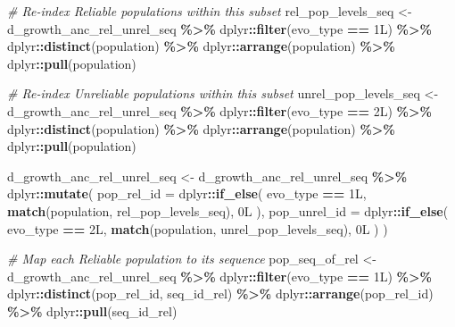 \documentclass[
]{article}
\newenvironment{Shaded}{\begin{snugshade}}{\end{snugshade}}
\newcommand{\AttributeTok}[1]{\textcolor[rgb]{0.13,0.29,0.53}{#1}}
\newcommand{\CommentTok}[1]{\textcolor[rgb]{0.56,0.35,0.01}{\textit{#1}}}
\newcommand{\DataTypeTok}[1]{\textcolor[rgb]{0.13,0.29,0.53}{#1}}
\newcommand{\DecValTok}[1]{\textcolor[rgb]{0.00,0.00,0.81}{#1}}
\newcommand{\FunctionTok}[1]{\textcolor[rgb]{0.13,0.29,0.53}{\textbf{#1}}}
\newcommand{\NormalTok}[1]{#1}
\newcommand{\OtherTok}[1]{\textcolor[rgb]{0.56,0.35,0.01}{#1}}
\newcommand{\SpecialCharTok}[1]{\textcolor[rgb]{0.81,0.36,0.00}{\textbf{#1}}}
\begin{document}
\begin{Shaded}
\begin{Highlighting}[]
\CommentTok{\# Re{-}index Reliable populations within this subset}
\NormalTok{rel\_pop\_levels\_seq }\OtherTok{\textless{}{-}}\NormalTok{ d\_growth\_anc\_rel\_unrel\_seq }\SpecialCharTok{\%\textgreater{}\%}
\NormalTok{  dplyr}\SpecialCharTok{::}\FunctionTok{filter}\NormalTok{(evo\_type }\SpecialCharTok{==} \DecValTok{1}\DataTypeTok{L}\NormalTok{) }\SpecialCharTok{\%\textgreater{}\%}
\NormalTok{  dplyr}\SpecialCharTok{::}\FunctionTok{distinct}\NormalTok{(population) }\SpecialCharTok{\%\textgreater{}\%}
\NormalTok{  dplyr}\SpecialCharTok{::}\FunctionTok{arrange}\NormalTok{(population) }\SpecialCharTok{\%\textgreater{}\%}
\NormalTok{  dplyr}\SpecialCharTok{::}\FunctionTok{pull}\NormalTok{(population)}

\CommentTok{\# Re{-}index Unreliable populations within this subset}
\NormalTok{unrel\_pop\_levels\_seq }\OtherTok{\textless{}{-}}\NormalTok{ d\_growth\_anc\_rel\_unrel\_seq }\SpecialCharTok{\%\textgreater{}\%}
\NormalTok{  dplyr}\SpecialCharTok{::}\FunctionTok{filter}\NormalTok{(evo\_type }\SpecialCharTok{==} \DecValTok{2}\DataTypeTok{L}\NormalTok{) }\SpecialCharTok{\%\textgreater{}\%}
\NormalTok{  dplyr}\SpecialCharTok{::}\FunctionTok{distinct}\NormalTok{(population) }\SpecialCharTok{\%\textgreater{}\%}
\NormalTok{  dplyr}\SpecialCharTok{::}\FunctionTok{arrange}\NormalTok{(population) }\SpecialCharTok{\%\textgreater{}\%}
\NormalTok{  dplyr}\SpecialCharTok{::}\FunctionTok{pull}\NormalTok{(population)}

\NormalTok{d\_growth\_anc\_rel\_unrel\_seq }\OtherTok{\textless{}{-}}\NormalTok{ d\_growth\_anc\_rel\_unrel\_seq }\SpecialCharTok{\%\textgreater{}\%}
\NormalTok{  dplyr}\SpecialCharTok{::}\FunctionTok{mutate}\NormalTok{(}
    \AttributeTok{pop\_rel\_id =}\NormalTok{ dplyr}\SpecialCharTok{::}\FunctionTok{if\_else}\NormalTok{(}
\NormalTok{      evo\_type }\SpecialCharTok{==} \DecValTok{1}\DataTypeTok{L}\NormalTok{,}
      \FunctionTok{match}\NormalTok{(population, rel\_pop\_levels\_seq),}
      \DecValTok{0}\DataTypeTok{L}
\NormalTok{    ),}
    \AttributeTok{pop\_unrel\_id =}\NormalTok{ dplyr}\SpecialCharTok{::}\FunctionTok{if\_else}\NormalTok{(}
\NormalTok{      evo\_type }\SpecialCharTok{==} \DecValTok{2}\DataTypeTok{L}\NormalTok{,}
      \FunctionTok{match}\NormalTok{(population, unrel\_pop\_levels\_seq),}
      \DecValTok{0}\DataTypeTok{L}
\NormalTok{    )}
\NormalTok{  )}

\CommentTok{\# Map each Reliable population to its sequence}
\NormalTok{pop\_seq\_of\_rel }\OtherTok{\textless{}{-}}\NormalTok{ d\_growth\_anc\_rel\_unrel\_seq }\SpecialCharTok{\%\textgreater{}\%}
\NormalTok{  dplyr}\SpecialCharTok{::}\FunctionTok{filter}\NormalTok{(evo\_type }\SpecialCharTok{==} \DecValTok{1}\DataTypeTok{L}\NormalTok{) }\SpecialCharTok{\%\textgreater{}\%}
\NormalTok{  dplyr}\SpecialCharTok{::}\FunctionTok{distinct}\NormalTok{(pop\_rel\_id, seq\_id\_rel) }\SpecialCharTok{\%\textgreater{}\%}
\NormalTok{  dplyr}\SpecialCharTok{::}\FunctionTok{arrange}\NormalTok{(pop\_rel\_id) }\SpecialCharTok{\%\textgreater{}\%}
\NormalTok{  dplyr}\SpecialCharTok{::}\FunctionTok{pull}\NormalTok{(seq\_id\_rel)}


\end{Highlighting}
\end{Shaded}
\end{document}
